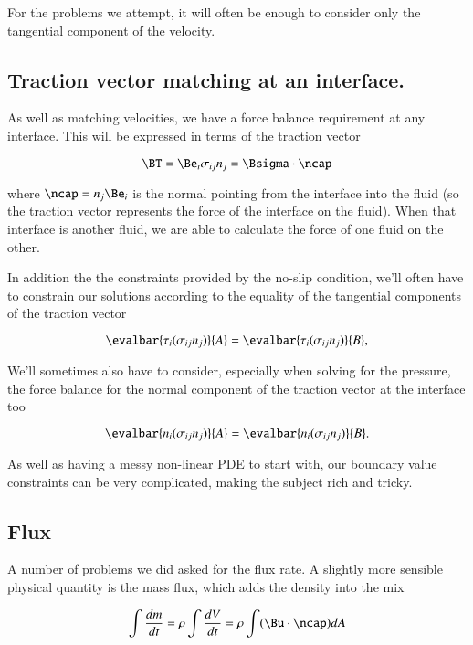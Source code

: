 For the problems we attempt, it will often be enough to consider only the tangential component of the velocity.

\subsection{Traction vector matching at an interface.}

As well as matching velocities, we have a force balance requirement at any interface.  This will be expressed in terms of the traction vector

\begin{equation}\label{eqn:continuumFluidsReview:1210}
\BT = \Be_i \sigma_{ij} n_j = \Bsigma \cdot \ncap
\end{equation}

where $\ncap = n_j \Be_i$ is the normal pointing from the interface into the fluid (so the traction vector represents the force of the interface on the fluid).  When that interface is another fluid, we are able to calculate the force of one fluid on the other.

In addition the the constraints provided by the no-slip condition, we'll often have to constrain our solutions according to the equality of the tangential components of the traction vector

\begin{equation}\label{eqn:continuumFluidsReview:1230}
\evalbar{\tau_i (\sigma_{ij} n_j)}{A} =
\evalbar{\tau_i (\sigma_{ij} n_j)}{B},
\end{equation}

We'll sometimes also have to consider, especially when solving for the pressure, the force balance for the normal component of the traction vector at the interface too

\begin{equation}\label{eqn:continuumFluidsReview:1250}
\evalbar{n_i (\sigma_{ij} n_j)}{A} =
\evalbar{n_i (\sigma_{ij} n_j)}{B}.
\end{equation}

As well as having a messy non-linear PDE to start with, our boundary value constraints can be very complicated, making the subject rich and tricky.

\subsection{Flux}

A number of problems we did asked for the flux rate.  A slightly more sensible physical quantity is the mass flux, which adds the density into the mix

\begin{equation}\label{eqn:continuumFluidsReview:1450}
\int \frac{dm}{dt} = \rho \int \frac{dV}{dt} = \rho \int (\Bu \cdot \ncap) dA
\end{equation}

